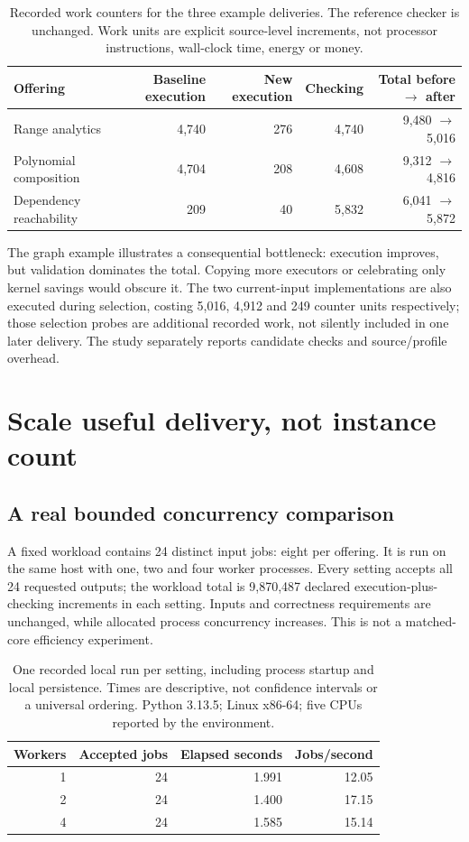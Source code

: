 \documentclass[11pt,letterpaper]{article}
\begin{document}
\begin{table}[htbp]\centering\small
\caption{Recorded work counters for the three example deliveries. The reference checker is unchanged. Work units are explicit source-level increments, not processor instructions, wall-clock time, energy or money.}
\begin{tabularx}{\linewidth}{@{}Yrrrr@{}}\toprule
Offering & Baseline execution & New execution & Checking & Total before $\to$ after\\\midrule
Range analytics & 4,740 & 276 & 4,740 & 9,480 $\to$ 5,016\\
Polynomial composition & 4,704 & 208 & 4,608 & 9,312 $\to$ 4,816\\
Dependency reachability & 209 & 40 & 5,832 & 6,041 $\to$ 5,872\\\bottomrule
\end{tabularx}
\label{tab:work}
\end{table}

The graph example illustrates a consequential bottleneck: execution improves, but validation dominates the total. Copying more executors or celebrating only kernel savings would obscure it. The two current-input implementations are also executed during selection, costing 5,016, 4,912 and 249 counter units respectively; those selection probes are additional recorded work, not silently included in one later delivery. The study separately reports candidate checks and source/profile overhead.

\section{Scale useful delivery, not instance count}
\subsection{A real bounded concurrency comparison}
A fixed workload contains 24 distinct input jobs: eight per offering. It is run on the same host with one, two and four worker processes. Every setting accepts all 24 requested outputs; the workload total is 9,870,487 declared execution-plus-checking increments in each setting. Inputs and correctness requirements are unchanged, while allocated process concurrency increases. This is not a matched-core efficiency experiment.

\begin{table}[htbp]\centering\small
\caption{One recorded local run per setting, including process startup and local persistence. Times are descriptive, not confidence intervals or a universal ordering. Python 3.13.5; Linux x86-64; five CPUs reported by the environment.}
\begin{tabular}{@{}rrrr@{}}\toprule
Workers & Accepted jobs & Elapsed seconds & Jobs/second\\\midrule
1 & 24 & 1.991 & 12.05\\
2 & 24 & 1.400 & 17.15\\
4 & 24 & 1.585 & 15.14\\\bottomrule
\end{tabular}
\label{tab:scale}
\end{table}
\end{document}

